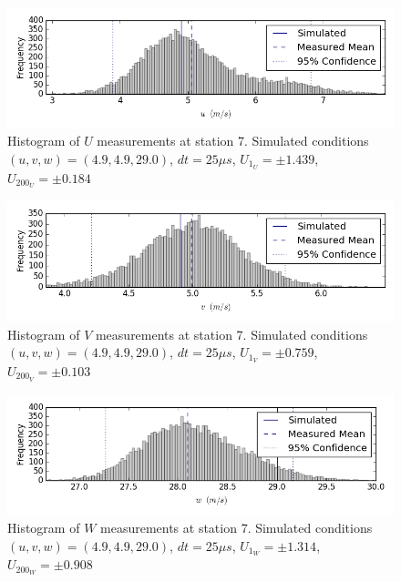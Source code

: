 \begin{figure}[H]
\centering
\includegraphics[width=6in]{figs/Ely_May28th07001/uncertainty_Ely_May28th07001_U}
\caption{Histogram of $U$ measurements at station 7. Simulated conditions $(u,v,w)=(4.9, 4.9, 29.0)$, $dt=25 \mu s$, $U_1_U=\pm 1.439$, $U_200_U=\pm 0.184$}
\label{fig:uncertainty_Ely_May28th07001_U}
\end{figure}


\begin{figure}[H]
\centering
\includegraphics[width=6in]{figs/Ely_May28th07001/uncertainty_Ely_May28th07001_V}
\caption{Histogram of $V$ measurements at station 7. Simulated conditions $(u,v,w)=(4.9, 4.9, 29.0)$, $dt=25 \mu s$, $U_1_V=\pm 0.759$, $U_200_V=\pm 0.103$}
\label{fig:uncertainty_Ely_May28th07001_V}
\end{figure}


\begin{figure}[H]
\centering
\includegraphics[width=6in]{figs/Ely_May28th07001/uncertainty_Ely_May28th07001_W}
\caption{Histogram of $W$ measurements at station 7. Simulated conditions $(u,v,w)=(4.9, 4.9, 29.0)$, $dt=25 \mu s$, $U_1_W=\pm 1.314$, $U_200_W=\pm 0.908$}
\label{fig:uncertainty_Ely_May28th07001_W}
\end{figure}


